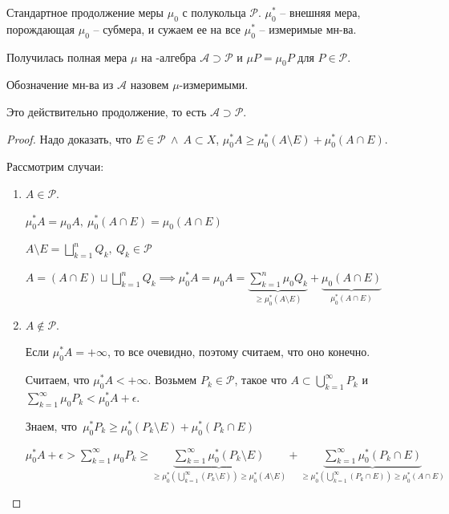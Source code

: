 \begin{definition}
    Стандартное продолжение меры $\mu_0$ с полукольца $\mathcal{P}$. $\mu^*_0$ -- внешняя мера, порождающая $\mu_0$ -- субмера, и сужаем ее на все $\mu^*_0$ -- измеримые мн-ва.

    Получилась полная мера $\mu$ на \sigma-алгебра $\mathcal{A} \supset \mathcal{P}$ и $\mu P = \mu_0 P$ для $P \in \mathcal{P}$.

    Обозначение мн-ва из $\mathcal{A}$ назовем $\mu$-измеримыми.
\end{definition}

\begin{theorem}
    Это действительно продолжение, то есть $\mathcal{A} \supset \mathcal{P}$.
\end{theorem}
\begin{proof}
    Надо доказать, что $E \in \mathcal{P} \ \land \ A \subset X$, $\mu^*_0 A \geq \mu^*_0 (A \setminus E) + \mu^*_0 (A \cap E)$.

    Рассмотрим случаи:
    \begin{enumerate}
        \item {
            $A \in \mathcal{P}$.

            $\mu^*_0 A = \mu_0 A, \ \mu^*_0 (A \cap E) = \mu_0 (A \cap E)$

            $A \setminus E = \bigsqcup_{k=1}^{n} Q_k, \ Q_k \in \mathcal{P}$

            $A = (A \cap E) \sqcup \bigsqcup_{k=1}^{n} Q_k \implies \mu^*_0 A = \mu_0 A = \underbrace{\sum_{k=1}^{n} \mu_0 Q_k}_{\geq \mu^*_0 (A \setminus E)} + \underbrace{\mu_0 (A \cap E)}_{\mu^*_0 (A \cap E)}$
        }
        \item {
            $A \notin \mathcal{P}$.

            Если $\mu^*_0A = +\infty$, то все очевидно, поэтому считаем, что оно конечно.

            Считаем, что $\mu^*_0 A < +\infty$. Возьмем $P_k \in \mathcal{P}$, такое что $A \subset \bigcup_{k=1}^{\infty} P_k$ и $\sum_{k=1}^{\infty} \mu_0 P_k < \mu^*_0 A + \epsilon$.

            Знаем, что $\mu^*_0 P_k \geq \mu^*_0 (P_k \setminus E) + \mu^*_0 (P_k \cap E)$

            $\mu^*_0 A + \epsilon > \sum_{k=1}^{\infty} \mu_0 P_k \geq \underbrace{\sum_{k=1}^{\infty} \mu^*_0 (P_k \setminus E)}_{\geq \mu^*_0 (\bigcup_{k=1}^{\infty} (P_k \setminus E)) \geq \mu^*_0 (A \setminus E)} + \underbrace{\sum_{k=1}^{\infty} \mu^*_0 (P_k \cap E)}_{\geq \mu^*_0 (\bigcup_{k=1}^{\infty} (P_k \cap E)) \geq \mu^*_0 (A \cap E)}$
        }
    \end{enumerate}
\end{proof}

